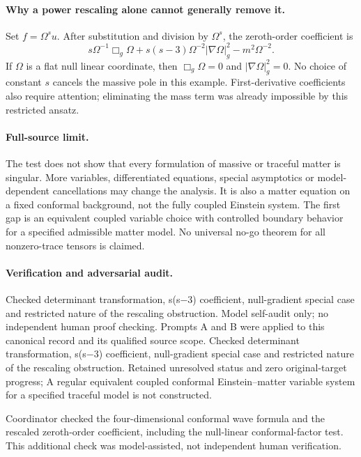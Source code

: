 \documentclass[11pt]{article}
\begin{document}
\paragraph{Why a power rescaling alone cannot generally remove it.} Set $f=\Omega^s u$. After substitution and division by $\Omega^s$, the zeroth-order coefficient is
\[
 s\Omega^{-1}\Box_g\Omega+s(s-3)\Omega^{-2}|\nabla\Omega|_g^2-m^2\Omega^{-2}.
\]
If $\Omega$ is a flat null linear coordinate, then $\Box_g\Omega=0$ and $|\nabla\Omega|_g^2=0$. No choice of constant $s$ cancels the massive pole in this example. First-derivative coefficients also require attention; eliminating the mass term was already impossible by this restricted ansatz.

\paragraph{Full-source limit.} The test does not show that every formulation of massive or traceful matter is singular. More variables, differentiated equations, special asymptotics or model-dependent cancellations may change the analysis. It is also a matter equation on a fixed conformal background, not the fully coupled Einstein system. The first gap is an equivalent coupled variable choice with controlled boundary behavior for a specified admissible matter model. No universal no-go theorem for all nonzero-trace tensors is claimed.

\paragraph{Verification and adversarial audit.}
Checked determinant transformation, s(s−3) coefficient, null-gradient special case and restricted nature of the rescaling obstruction. Model self-audit only; no independent human proof checking. Prompts A and B were applied to this canonical record and its qualified source scope. Checked determinant transformation, s(s−3) coefficient, null-gradient special case and restricted nature of the rescaling obstruction. Retained unresolved status and zero original-target progress; A regular equivalent coupled conformal Einstein–matter variable system for a specified traceful model is not constructed.

Coordinator checked the four-dimensional conformal wave formula and the rescaled zeroth-order coefficient, including the null-linear conformal-factor test. This additional check was model-assisted, not independent human verification.
\end{document}

